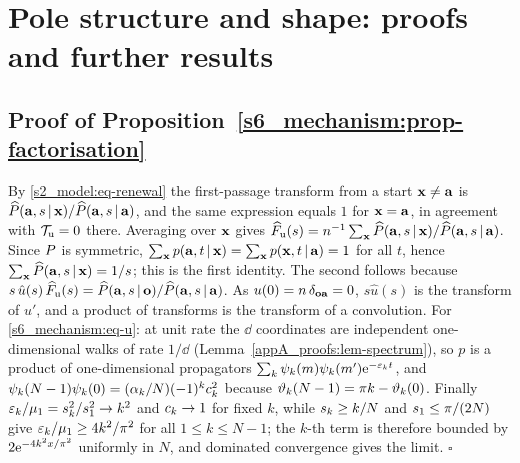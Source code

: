\section{Pole structure and shape: proofs and further results}\label{sup_mechanism:sec}

\subsection{Proof of Proposition~\ref{s6_mechanism:prop-factorisation}}

By \eqref{s2_model:eq-renewal} the first-passage transform from a start $\mathbf{x}\neq\mathbf{a}$ is
$\widehat{P}(\mathbf{a},s\,|\,\mathbf{x})/\widehat{P}(\mathbf{a},s\,|\,\mathbf{a})$, and the same expression equals $1$ for $\mathbf{x}=\mathbf{a}$, in agreement with
$\mathcal{T}_{\mathrm u}=0$ there. Averaging over $\mathbf{x}$ gives
$\widehat{F}_{\mathrm u}(s)=n^{-1}\sum_{\mathbf{x}}\widehat{P}(\mathbf{a},s\,|\,\mathbf{x})/\widehat{P}(\mathbf{a},s\,|\,\mathbf{a})$. Since $P$ is symmetric,
$\sum_{\mathbf{x}}p(\mathbf{a},t\,|\,\mathbf{x})=\sum_{\mathbf{x}}p(\mathbf{x},t\,|\,\mathbf{a})=1$ for all $t$, hence $\sum_{\mathbf{x}}\widehat{P}(\mathbf{a},s\,|\,\mathbf{x})=1/s$; this is the
first identity. The second follows because $s\,\hat u(s)\,\widehat{F}_{\mathrm u}(s)=\widehat{P}(\mathbf{a},s\,|\,\mathbf{o})/\widehat{P}(\mathbf{a},s\,|\,\mathbf{a})$. As
$u(0)=n\,\delta_{\mathbf{o}\mathbf{a}}=0$, $s\hat u(s)$ is the transform of $u'$, and a product of transforms is the transform of a
convolution. For \eqref{s6_mechanism:eq-u}: at unit rate the $\dd$ coordinates are independent one-dimensional walks of
rate $1/\dd$ (Lemma~\ref{appA_proofs:lem-spectrum}), so $p$ is a product of one-dimensional propagators
$\sum_k\psi_k(m)\psi_k(m')\mathrm{e}^{-\varepsilon_k t}$, and $\psi_k(N-1)\psi_k(0)=(\alpha_{k}/N)(-1)^{k}c_{k}^{2}$ because
$\vartheta_{k}(N-1)=\pi k-\vartheta_{k}(0)$. Finally $\varepsilon_k/\mu_{1}=s_{k}^{2}/s_{1}^{2}\to k^{2}$ and $c_{k}\to1$ for fixed $k$,
while $s_{k}\ge k/N$ and $s_{1}\le\pi/(2N)$ give $\varepsilon_k/\mu_{1}\ge4k^{2}/\pi^{2}$ for all $1\le k\le N-1$; the
$k$-th term is therefore bounded by $2\mathrm{e}^{-4k^{2}x/\pi^{2}}$ uniformly in $N$, and dominated convergence gives the
limit. \hfill$\square$

